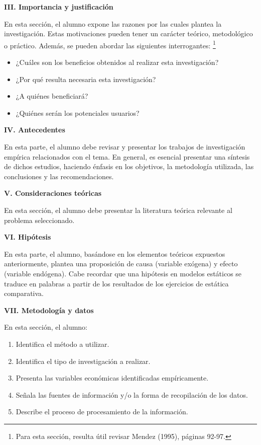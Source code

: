 \documentclass[
  jou,
  floatsintext,
  longtable,
  a4paper,
  nolmodern,
  notxfonts,
  notimes,
  12pt,
  colorlinks=true,linkcolor=blue,citecolor=blue,urlcolor=blue]{apa7}
\providecommand{\tightlist}{%
  \setlength{\itemsep}{0pt}\setlength{\parskip}{0pt}}
\begin{document}
\textbf{III. Importancia y justificación}

En esta sección, el alumno expone las razones por las cuales plantea la
investigación. Estas motivaciones pueden tener un carácter teórico,
metodológico o práctico. Además, se pueden abordar las siguientes
interrogantes: \footnote{Para esta sección, resulta útil revisar Mendez
  (1995), páginas 92-97.}

\begin{itemize}
\tightlist
\item
  ¿Cuáles son los beneficios obtenidos al realizar esta investigación?
\item
  ¿Por qué resulta necesaria esta investigación?
\item
  ¿A quiénes beneficiará?
\item
  ¿Quiénes serán los potenciales usuarios?
\end{itemize}

\textbf{IV. Antecedentes}

En esta parte, el alumno debe revisar y presentar los trabajos de
investigación empírica relacionados con el tema. En general, es esencial
presentar una síntesis de dichos estudios, haciendo énfasis en los
objetivos, la metodología utilizada, las conclusiones y las
recomendaciones.

\textbf{V. Consideraciones teóricas}

En esta sección, el alumno debe presentar la literatura teórica
relevante al problema seleccionado.

\textbf{VI. Hipótesis}

En esta parte, el alumno, basándose en los elementos teóricos expuestos
anteriormente, plantea una proposición de causa (variable exógena) y
efecto (variable endógena). Cabe recordar que una hipótesis en modelos
estáticos se traduce en palabras a partir de los resultados de los
ejercicios de estática comparativa.

\textbf{VII. Metodología y datos}

En esta sección, el alumno:

\begin{enumerate}
\def\labelenumi{\arabic{enumi}.}
\tightlist
\item
  Identifica el método a utilizar.
\item
  Identifica el tipo de investigación a realizar.
\item
  Presenta las variables económicas identificadas empíricamente.
\item
  Señala las fuentes de información y/o la forma de recopilación de los
  datos.
\item
  Describe el proceso de procesamiento de la información.
\end{enumerate}
\end{document}
